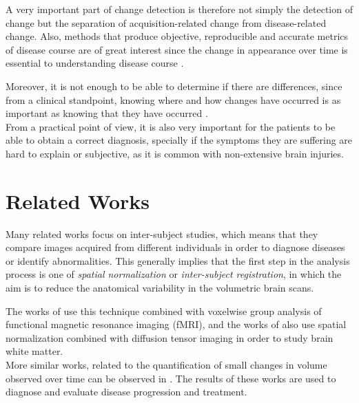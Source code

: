 A very important part of change detection is therefore not simply the detection of change but the separation of acquisition-related change from disease-related change. Also, methods that produce objective, reproducible and accurate metrics of disease course are of great interest since the change in appearance over time is essential to understanding disease course \cite{review1}.

Moreover, it is not enough to be able to determine if there are differences, since from a clinical standpoint, knowing where and how changes have occurred is as important as knowing that they have occurred \cite{review1}.\\


From a practical point of view, it is also very important for the patients to be able to obtain a correct diagnosis, specially if the symptoms they are suffering are hard to explain or subjective, as it is common with non-extensive brain injuries.

\section{Related Works}
Many related works focus on inter-subject studies, which means that they compare images acquired from different individuals in order to diagnose diseases or identify abnormalities. This generally implies that the first step in the analysis process is one of \textit{spatial normalization} or \textit{inter-subject registration}, in which the aim is to reduce the anatomical variability in the volumetric brain scans.

The works of \cite{zeffiro,svensen} use this technique combined with voxelwise group analysis of functional magnetic resonance imaging (fMRI), and the works of \cite{ardekani1,jones} also use spatial normalization combined with diffusion tensor imaging in order to study brain white matter.\\

More similar works, related to the quantification of small changes in volume observed over time can be observed in \cite{holden,rey}. The results of these works are used to diagnose and evaluate disease progression and treatment.


